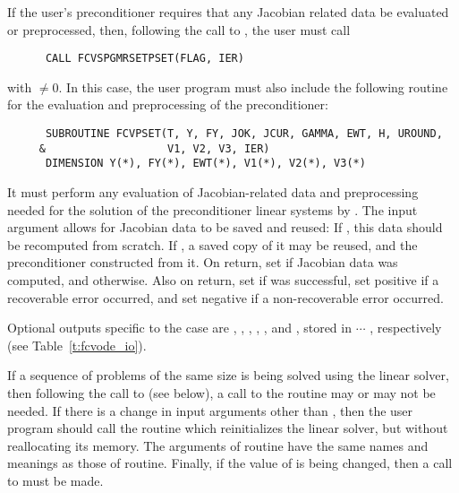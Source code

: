 \begin{Steps}
\begin{itemize}
    
    If the user's preconditioner requires that any Jacobian related data be evaluated
    or preprocessed, then, following the call to , the user must call
\begin{verbatim}
      CALL FCVSPGMRSETPSET(FLAG, IER)
\end{verbatim}
    with $\neq 0$.
    In this case, the user program must also include
    the following routine for the evaluation and preprocessing of the preconditioner:
\begin{verbatim}
      SUBROUTINE FCVPSET(T, Y, FY, JOK, JCUR, GAMMA, EWT, H, UROUND, 
     &                   V1, V2, V3, IER)
      DIMENSION Y(*), FY(*), EWT(*), V1(*), V2(*), V3(*) 
\end{verbatim}
    It must perform any evaluation of Jacobian-related data and preprocessing needed
    for the solution of the preconditioner linear systems by .
    The input argument  allows for Jacobian data to be saved and reused:  If 
    , this data should be recomputed from scratch. If , a saved
    copy of it may be reused, and the preconditioner constructed from it.
    On return, set  if Jacobian data was computed, and  otherwise.
    Also on return, set  if  was successful, set 
    positive if a recoverable error occurred, and set  negative if a 
    non-recoverable error occurred.
    
    Optional outputs specific to the {\spgmr} case are , , , 
    , , and , stored in  $\cdots$ , 
    respectively (see Table~\ref{t:fcvode_io}).
    
    If a sequence of problems of the same size is being solved using the {\spgmr}
    linear solver, then following the call to  (see below), a call to the 
     routine may or may not be needed.  
    If there is a change in input arguments other than , then the user 
    program should call the routine  which
    reinitializes the {\spgmr} linear solver, but without reallocating its memory.
    The arguments of  routine have the same names and meanings
    as those of  routine.  Finally, if the value of  is
    being changed, then a call to  must be made.
  \end{itemize}    


\end{Steps}
